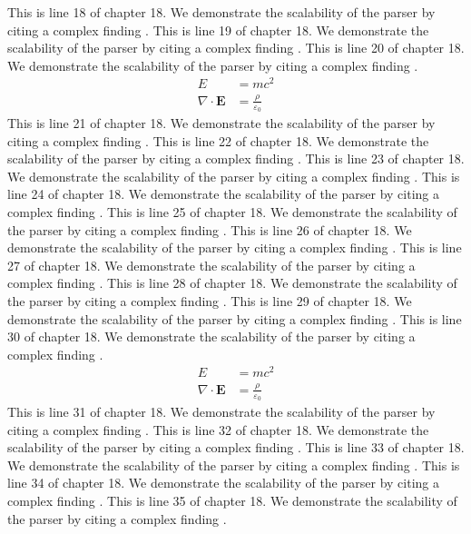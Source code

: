 This is line 18 of chapter 18. We demonstrate the scalability of the parser by citing a complex finding \cite{ref18_18}.
This is line 19 of chapter 18. We demonstrate the scalability of the parser by citing a complex finding \cite{ref18_19}.
This is line 20 of chapter 18. We demonstrate the scalability of the parser by citing a complex finding \cite{ref18_20}.
\begin{align*}
  E &= mc^2 \\
  \nabla \cdot \mathbf{E} &= \frac{\rho}{\varepsilon_0}
\end{align*}
This is line 21 of chapter 18. We demonstrate the scalability of the parser by citing a complex finding \cite{ref18_21}.
This is line 22 of chapter 18. We demonstrate the scalability of the parser by citing a complex finding \cite{ref18_22}.
This is line 23 of chapter 18. We demonstrate the scalability of the parser by citing a complex finding \cite{ref18_23}.
This is line 24 of chapter 18. We demonstrate the scalability of the parser by citing a complex finding \cite{ref18_24}.
This is line 25 of chapter 18. We demonstrate the scalability of the parser by citing a complex finding \cite{ref18_25}.
This is line 26 of chapter 18. We demonstrate the scalability of the parser by citing a complex finding \cite{ref18_26}.
This is line 27 of chapter 18. We demonstrate the scalability of the parser by citing a complex finding \cite{ref18_27}.
This is line 28 of chapter 18. We demonstrate the scalability of the parser by citing a complex finding \cite{ref18_28}.
This is line 29 of chapter 18. We demonstrate the scalability of the parser by citing a complex finding \cite{ref18_29}.
This is line 30 of chapter 18. We demonstrate the scalability of the parser by citing a complex finding \cite{ref18_30}.
\begin{align*}
  E &= mc^2 \\
  \nabla \cdot \mathbf{E} &= \frac{\rho}{\varepsilon_0}
\end{align*}
This is line 31 of chapter 18. We demonstrate the scalability of the parser by citing a complex finding \cite{ref18_31}.
This is line 32 of chapter 18. We demonstrate the scalability of the parser by citing a complex finding \cite{ref18_32}.
This is line 33 of chapter 18. We demonstrate the scalability of the parser by citing a complex finding \cite{ref18_33}.
This is line 34 of chapter 18. We demonstrate the scalability of the parser by citing a complex finding \cite{ref18_34}.
This is line 35 of chapter 18. We demonstrate the scalability of the parser by citing a complex finding \cite{ref18_35}.
